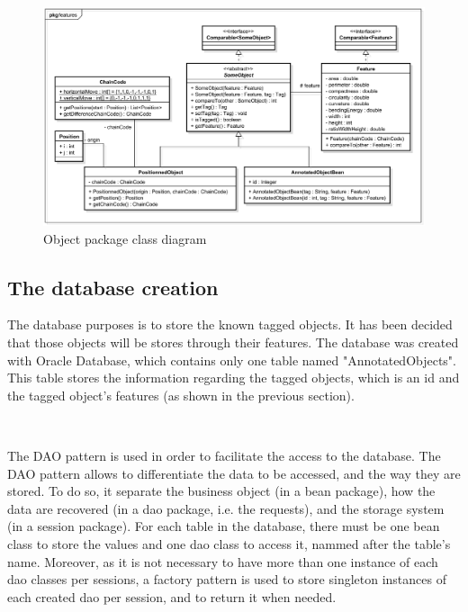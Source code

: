 \begin{figure}[h]
	\centering 
	\includegraphics[width=1\textwidth]{images/diagrams/class_diagram_objects}
	\caption{Object package class diagram}
	\label{fig:diagram:class:objects}
\end{figure}








\subsection{The database creation}

The database purposes is to store the known tagged objects. It has been decided that those objects will be stores through their features. The database was created with Oracle Database, which contains only one table named "AnnotatedObjects". This table stores the information regarding the tagged objects, which is an id and the tagged object's features (as shown in the previous section).

~~

The \gls{DAO} pattern is used in order to facilitate the access to the database. The \gls{DAO} pattern allows to differentiate the data to be accessed, and the way they are stored. To do so, it separate the business object (in a bean package), how the data are recovered (in a dao package, i.e. the requests), and the storage system (in a session package). For each table in the database, there must be one bean class to store the values and one dao class to access it, nammed after the table's name. Moreover, as it is not necessary to have more than one instance of each dao classes per sessions, a factory pattern is used to store singleton instances of each created dao per session, and to return it when needed.


